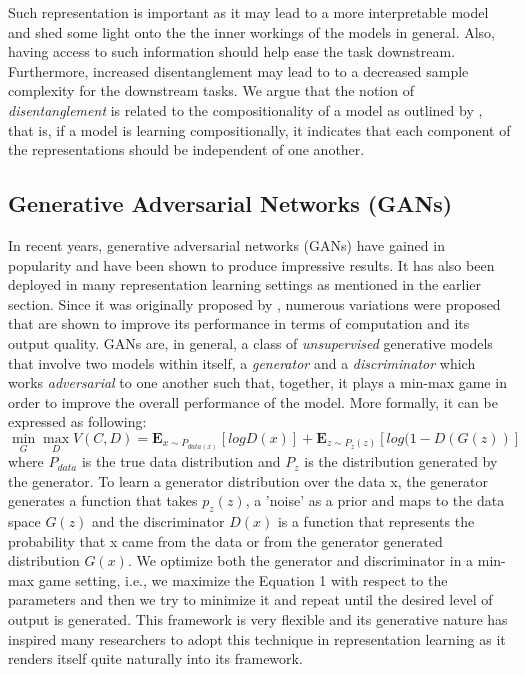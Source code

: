 \documentclass[11pt, letterpaper, oneside]{article}
\begin{document}
Such representation is important as it may lead to a more interpretable model and shed some light onto the the inner workings of the models in general. Also, having access to such information should help ease the task downstream. Furthermore, increased disentanglement may lead to to a decreased sample complexity for the downstream tasks. We argue that the notion of \textit{disentanglement} is related to the compositionality of a model as outlined by \cite{hupkes_compositionality_2020}, that is, if a model is learning compositionally, it indicates that each component of the representations should be independent of one another. 

\subsection{Generative Adversarial Networks (GANs)}
In recent years, generative adversarial networks (GANs) have gained in popularity and have been shown to produce impressive results. It has also been deployed in many representation learning settings as mentioned in the earlier section.  Since it was originally proposed by \cite{goodfellow_generative_2014},  numerous variations were proposed that are shown to improve its performance in terms of computation and its output quality. GANs are, in general, a class of \textit{unsupervised} generative models that involve two models within itself, a \textit{generator} and a \textit{discriminator} which works \textit{adversarial} to one another such that, together, it plays a min-max game in order to improve the overall performance of the model. More formally, it can be expressed as following:
\begin{equation} \label{eu_eqn000}
 \min_{G}  \max_{D} V(C, D) = \mathbf{E}_{x \sim P_{data(x)}}[log D(x)] + \mathbf{E}_{z \sim P_z(z)}[log {(1-D(G(z))}]
\end{equation}
where $P_{data}$ is the true data distribution and $P_z$ is the distribution generated by the generator. To learn a generator distribution over the data x, the generator generates a function that takes $p_z(z)$, a 'noise' as a prior and maps to the data space $G(z)$ and the discriminator $D(x)$ is a function that represents the probability that x came from the data or from the generator generated distribution $G(x)$. We optimize both the generator and discriminator in a min-max game setting, i.e., we maximize the Equation 1 with respect to the parameters and then we try to minimize it and repeat until the desired level of output is generated.  This framework is very flexible and its generative nature has inspired many researchers to adopt this technique in representation learning as it renders itself quite naturally into its framework.
\end{document}
